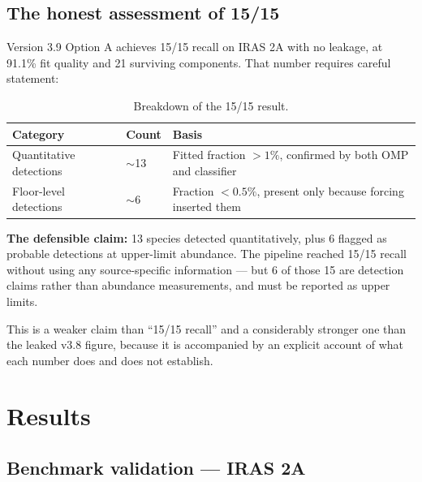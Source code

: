 \documentclass[11pt,a4paper]{article}
\begin{document}
\subsection{The honest assessment of 15/15}

Version 3.9 Option A achieves 15/15 recall on IRAS 2A with no leakage, at
91.1\% fit quality and 21 surviving components. That number requires
careful statement:

\begin{table}[H]
\centering
\small
\begin{tabular}{@{}lll@{}}
\toprule
\textbf{Category} & \textbf{Count} & \textbf{Basis} \\
\midrule
Quantitative detections & $\sim$13 &
Fitted fraction $>1\%$, confirmed by both OMP and classifier \\
Floor-level detections  & $\sim$6 &
Fraction $<0.5\%$, present only because forcing inserted them \\
\bottomrule
\end{tabular}
\caption{Breakdown of the 15/15 result.}
\end{table}

\begin{goodbox}
\textbf{The defensible claim:} 13 species detected quantitatively, plus 6
flagged as probable detections at upper-limit abundance. The pipeline
reached 15/15 recall without using any source-specific information --- but
6 of those 15 are detection claims rather than abundance measurements, and
must be reported as upper limits.
\end{goodbox}

This is a weaker claim than ``15/15 recall'' and a considerably stronger
one than the leaked v3.8 figure, because it is accompanied by an explicit
account of what each number does and does not establish.

\section{Results}

\subsection{Benchmark validation --- IRAS 2A}
\end{document}
